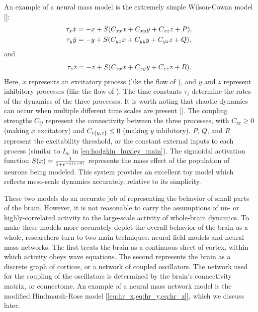 An example of a neural mass model is the extremely simple Wilson-Cowan model []:
\begin{align}
  \label{eq:wc_x}
  \tau_{x} \dot{x}
  &=
    -x + S \pqty{C_{x x} x + C_{x y} y + C_{x z} z + P}, \\
  \label{eq:wc_y}
  \tau_{y} \dot{y}
  &=
    -y + S \pqty{C_{y x} x + C_{y y} y + C_{y z} z + Q},
\end{align}
and
\begin{equation}
  \label{eq:wc_z}
  \tau_{z} \dot{z}
  =
    -z + S \pqty{C_{z x} x + C_{z y} y + C_{z z} z + R}.
\end{equation}
Here, $x$ represents an excitatory process (like the flow of ), and $y$ and $z$ represent inhibitory processes (like the flow of ).
The time constants $\tau_{i}$ determine the rates of the dynamics of the three processes.
It is worth noting that chaotic dynamics can occur when multiple different time scales are present [].
The coupling strengths $C_{i j}$ represent the connectivity between the three processes, with $C_{i x} \geq 0$ (making $x$ excitatory) and $C_{i \Bqty{y, z}} \leq 0$ (making $y$ inhibitory).
$P$, $Q$, and $R$ represent the excitability threshold, or the constant external inputs to each process (similar to $I_{m}$ in \cref{eq:hodgkin_huxley_main}).
The sigmoidal activation function $S(x) = \frac{1}{1 + e^{-a \pqty{x - \theta}}}$ represents the mass effect of the population of neurons being modeled.
This system provides an excellent toy model which reflects meso-scale dynamics accurately, relative to its simplicity.

These two models do an accurate job of representing the behavior of small parts of the brain.
However, it is not reasonable to carry the assumptions of un- or highly-correlated activity to the large-scale activity of whole-brain dynamics.
To make these models more accurately depict the overall behavior of the brain as a whole, researchers turn to two main techniques: neural field models and neural mass networks.
The first treats the brain as a continuous sheet of cortex, within which activity obeys wave equations.
The second represents the brain as a discrete graph of cortices, or a network of coupled oscillators.
The network used for the coupling of the oscillators is determined by the brain's connectivity matrix, or connectome.
An example of a neural mass network model is the modified Hindmarsh-Rose model [\cref{eq:hr_x,eq:hr_y,eq:hr_z}], which we discuss later.

